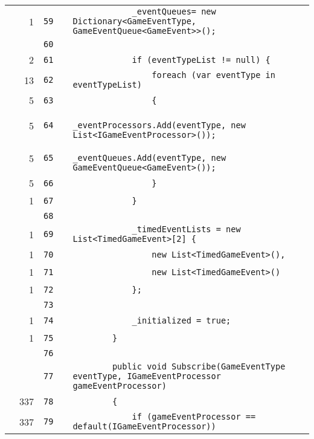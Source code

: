 \documentclass[a4paper,landscape,10pt]{article}
\begin{document}
\begin{longtable}[l]{lrrll}
\cellcolor{green} & 1 & \verb~59~ & & \verb~            _eventQueues= new Dictionary<GameEventType, GameEventQueue<GameEvent>>();~\\
\cellcolor{gray} &  & \verb~60~ & & \verb~~\\
\cellcolor{green} & 2 & \verb~61~ & & \verb~            if (eventTypeList != null) {~\\
\cellcolor{green} & 13 & \verb~62~ & & \verb~                foreach (var eventType in eventTypeList)~\\
\cellcolor{green} & 5 & \verb~63~ & & \verb~                {~\\
\cellcolor{green} & 5 & \verb~64~ & & \verb~                    _eventProcessors.Add(eventType, new List<IGameEventProcessor>());~\\
\cellcolor{green} & 5 & \verb~65~ & & \verb~                    _eventQueues.Add(eventType, new GameEventQueue<GameEvent>());~\\
\cellcolor{green} & 5 & \verb~66~ & & \verb~                }~\\
\cellcolor{green} & 1 & \verb~67~ & & \verb~            }~\\
\cellcolor{gray} &  & \verb~68~ & & \verb~~\\
\cellcolor{green} & 1 & \verb~69~ & & \verb~            _timedEventLists = new List<TimedGameEvent>[2] {~\\
\cellcolor{green} & 1 & \verb~70~ & & \verb~                new List<TimedGameEvent>(),~\\
\cellcolor{green} & 1 & \verb~71~ & & \verb~                new List<TimedGameEvent>()~\\
\cellcolor{green} & 1 & \verb~72~ & & \verb~            };~\\
\cellcolor{gray} &  & \verb~73~ & & \verb~~\\
\cellcolor{green} & 1 & \verb~74~ & & \verb~            _initialized = true;~\\
\cellcolor{green} & 1 & \verb~75~ & & \verb~        }~\\
\cellcolor{gray} &  & \verb~76~ & & \verb~~\\
\cellcolor{gray} &  & \verb~77~ & & \verb~        public void Subscribe(GameEventType eventType, IGameEventProcessor gameEventProcessor)~\\
\cellcolor{green} & 337 & \verb~78~ & & \verb~        {~\\
\cellcolor{orange} & 337 & \verb~79~ & & \verb~            if (gameEventProcessor == default(IGameEventProcessor))~\\

\end{longtable}
\end{document}
